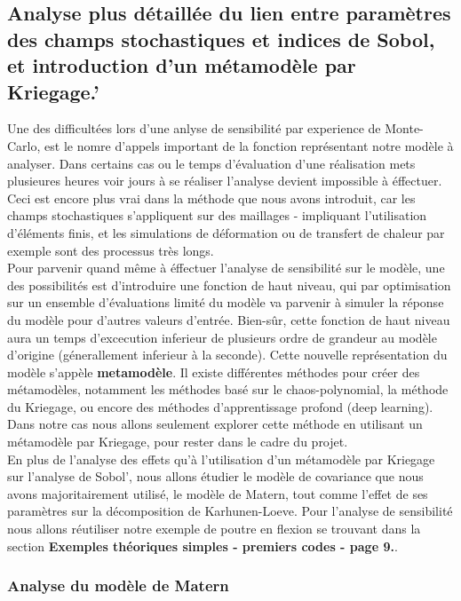 \documentclass[a4paper,10pt]{article}
\begin{document}
\subsection{Analyse plus détaillée du lien entre paramètres des champs stochastiques et indices de Sobol, et introduction d'un métamodèle par Kriegage.'}
	
	Une des difficultées lors d'une anlyse de sensibilité par experience de Monte-Carlo, est le nomre d'appels important de la fonction représentant notre modèle à analyser. Dans certains cas ou le temps d'évaluation d'une réalisation mets plusieures heures voir jours à se réaliser l'analyse devient impossible à éffectuer. Ceci est encore plus vrai dans la méthode que nous avons introduit, car les champs stochastiques s'appliquent sur des maillages - impliquant l'utilisation d'éléments finis, et les simulations de déformation ou de transfert de chaleur par exemple sont des processus très longs. \\
	Pour parvenir quand même à éffectuer l'analyse de sensibilité sur le modèle, une des possibilités est d'introduire une fonction de haut niveau, qui par optimisation sur un ensemble d'évaluations limité du modèle va parvenir à simuler la réponse du modèle pour d'autres valeurs d'entrée. Bien-sûr, cette fonction de haut niveau aura un temps d'excecution inferieur de plusieurs ordre de grandeur au modèle d'origine (génerallement inferieur à la seconde). Cette nouvelle représentation du modèle s'appèle \textbf{metamodèle}. Il existe différentes méthodes pour créer des métamodèles, notamment les méthodes basé sur le chaos-polynomial, la méthode du Kriegage, ou encore des méthodes d'apprentissage profond (deep learning). Dans notre cas nous allons seulement explorer cette méthode en utilisant un métamodèle par Kriegage, pour rester dans le cadre du projet. \\
	
	En plus de l'analyse des effets qu'à l'utilisation d'un métamodèle par Kriegage sur l'analyse de Sobol', nous allons étudier le modèle de covariance que nous avons majoritairement utilisé, le modèle de Matern, tout comme l'effet de ses paramètres sur la décomposition de Karhunen-Loeve. Pour l'analyse de sensibilité nous allons réutiliser notre exemple de poutre en flexion se trouvant dans la section \textbf{Exemples théoriques simples - premiers codes - page 9.}. 
	
	\subsubsection{Analyse du modèle de Matern}
	 
\end{document}
